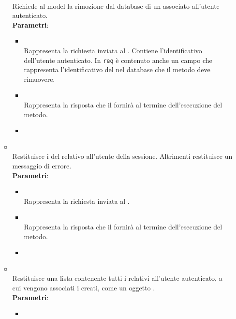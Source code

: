 \begin{itemize}
\begin{itemize}
\\ Richiede al model la rimozione dal database di un  associato all’utente autenticato.
\\ \textbf{Parametri}:
\begin{itemize}
\item {}
\\ Rappresenta la richiesta inviata al . Contiene l’identificativo dell’utente autenticato. In \texttt{req} è contenuto anche un campo che rappresenta l’identificativo del  nel database che il metodo deve rimuovere.
\item {}
\\ Rappresenta la risposta che il  fornirà al termine dell’esecuzione del metodo.
\item {}
\\ \dpNext
\end{itemize}
\item {}
\\ Restituisce i  del  relativo all’utente della sessione. Altrimenti restituisce un messaggio di errore.
\\ \textbf{Parametri}:
\begin{itemize}
\item {}
\\ Rappresenta la richiesta inviata al .
\item {}
\\ Rappresenta la risposta che il  fornirà al termine dell’esecuzione del metodo.
\item {}
\\ \dpNext
\end{itemize}
\item {}
\\ Restituisce una lista contenente tutti i  relativi all’utente autenticato, a cui vengono associati i  creati, come un oggetto .
\\ \textbf{Parametri}:
\begin{itemize}
\item {}

\end{itemize}
\end{itemize}
\end{itemize}
